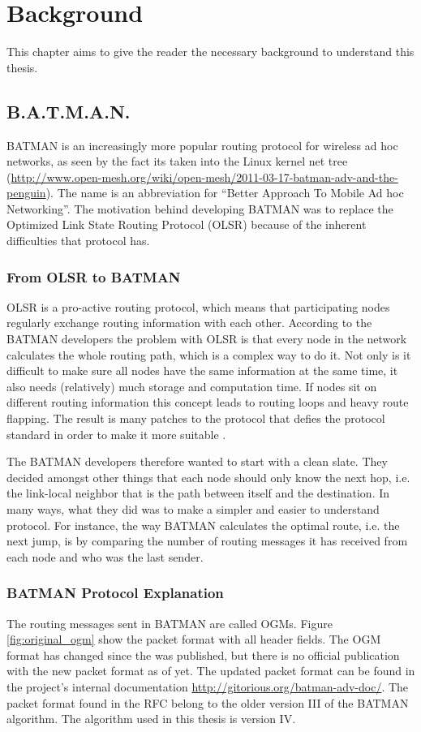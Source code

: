 \chapter{Background}
\acresetall

This chapter aims to give the reader the necessary background to understand this
thesis.

\section{B.A.T.M.A.N.}
BATMAN \cite{batman_rfc} is an increasingly more popular routing protocol for
wireless ad hoc networks, as seen by the fact its taken into the Linux kernel
net tree
(\url{http://www.open-mesh.org/wiki/open-mesh/2011-03-17-batman-adv-and-the-penguin}).
The name is an abbreviation for ``Better Approach To Mobile Ad hoc Networking''.
The motivation behind developing BATMAN was to replace the Optimized Link State
Routing Protocol (OLSR) \cite{why-starting-batman} because of the inherent
difficulties that protocol has.

\subsection{From OLSR to BATMAN}
OLSR is a pro-active routing protocol, which means that participating nodes
regularly exchange routing information with each other. According to the BATMAN
developers the problem with OLSR is that every node in the network calculates
the whole routing path, which is a complex way to do it. Not only is it
difficult to make sure all nodes have the same information at the same time,
it also needs (relatively) much storage and computation time. If nodes sit on
different routing information this concept leads to routing loops and heavy
route flapping. The result is many patches to the protocol that defies the
protocol standard in order to make it more suitable \cite{why-starting-batman}.

The BATMAN developers therefore wanted to start with a clean slate. They decided
amongst other things that each node should only know the next hop, i.e. the
link-local neighbor that is the path between itself and the destination. In
many ways, what they did was to make a simpler and easier to understand
protocol. For instance, the way BATMAN calculates the optimal route, i.e. the
next jump, is by comparing the number of routing messages it has received from
each node and who was the last sender.

\subsection{BATMAN Protocol Explanation}
The routing messages sent in BATMAN are called \acp{OGM}. Figure
\ref{fig:original_ogm} show the packet format with all header fields. The
\ac{OGM} format has changed since the \cite{batman_rfc} was published, but there
is no official publication with the new packet format as of yet. The updated
packet format can be found in the project's internal documentation
\url{http://gitorious.org/batman-adv-doc/}. The packet format found in the RFC
belong to the older version III of the BATMAN algorithm. The algorithm used in
this thesis is version IV.

